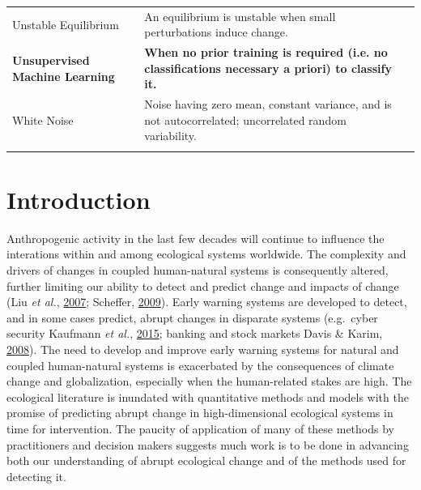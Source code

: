 \documentclass[12pt,twoside,openany]{reedthesis}
\begin{document}
\begin{landscape}
\begin{longtable}{>{\raggedright\arraybackslash}p{12em}>{\raggedright\arraybackslash}p{35em}>{\raggedright\arraybackslash}p{8em}}
Unstable Equilibrium & An equilibrium is unstable when small perturbations induce change. & \\
\textbf{Unsupervised Machine Learning} & \textbf{When no prior training is required (i.e. no classifications necessary a priori) to classify it.} & \textbf{}\\
White Noise & Noise having zero mean, constant variance, and is not autocorrelated; uncorrelated random variability. & \\*
\end{longtable}
\endgroup{}
\end{landscape}
\hypertarget{intro}{%
\chapter{Introduction}\label{intro}}

Anthropogenic activity in the last few decades will continue to influence the interations within and among ecological systems worldwide. The complexity and drivers of changes in coupled human-natural systems is consequently altered, further limiting our ability to detect and predict change and impacts of change (Liu \emph{et al.}, \protect\hyperlink{ref-liu_complexity_2007}{2007}; Scheffer, \protect\hyperlink{ref-scheffer_critical_2009}{2009}). Early warning systems are developed to detect, and in some cases predict, abrupt changes in disparate systems (e.g.~cyber security Kaufmann \emph{et al.}, \protect\hyperlink{ref-kaufmann2015structural}{2015}; banking and stock markets Davis \& Karim, \protect\hyperlink{ref-davis_comparing_2008}{2008}). The need to develop and improve early warning systems for natural and coupled human-natural systems is exacerbated by the consequences of climate change and globalization, especially when the human-related stakes are high. The ecological literature is inundated with quantitative methods and models with the promise of predicting abrupt change in high-dimensional ecological systems in time for intervention. The paucity of application of many of these methods by practitioners and decision makers suggests much work is to be done in advancing both our understanding of abrupt ecological change and of the methods used for detecting it.
\end{document}
